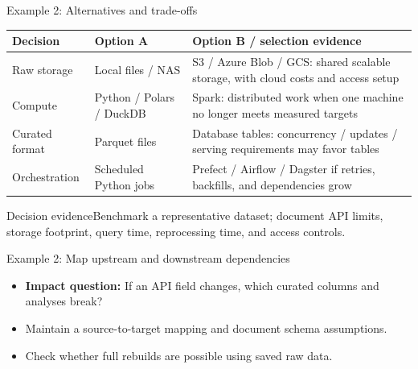 \documentclass[aspectratio=43,10pt]{beamer}
\begin{document}
\begin{frame}{Example 2: Alternatives and trade-offs}
\small
\begin{tabularx}{\textwidth}{@{}p{2.2cm}p{3.2cm}X@{}}\toprule
Decision & Option A & Option B / selection evidence \\ \midrule
Raw storage & Local files / NAS & S3 / Azure Blob / GCS: shared scalable storage, with cloud costs and access setup \\
Compute & Python / Polars / DuckDB & Spark: distributed work when one machine no longer meets measured targets \\
Curated format & Parquet files & Database tables: concurrency / updates / serving requirements may favor tables \\
Orchestration & Scheduled Python jobs & Prefect / Airflow / Dagster if retries, backfills, and dependencies grow \\
\bottomrule\end{tabularx}
\vspace{-1em}
\begin{block}{Decision evidence}Benchmark a representative dataset; document API limits, storage footprint, query time, reprocessing time, and access controls.\end{block}
\end{frame}

\begin{frame}{Example 2: Map upstream and downstream dependencies}
\centering
{}
\vspace{.6em}
\begin{itemize}
\item \textbf{Impact question:} If an API field changes, which curated columns and analyses break?
\item Maintain a source-to-target mapping and document schema assumptions.
\item Check whether full rebuilds are possible using saved raw data.
\end{itemize}
\end{frame}
\end{document}
